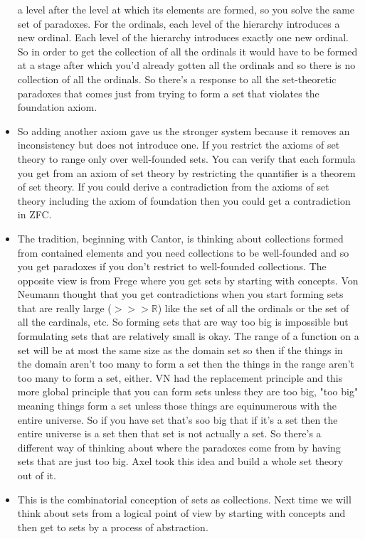 \documentclass[12pt]{article}
\theoremstyle{definition}
\begin{document}
\begin{itemize}
        a level after the level at which its elements are formed, so you solve
        the same set of paradoxes. For the ordinals, each level of the
        hierarchy introduces a new ordinal. Each level of the hierarchy
        introduces exactly one new ordinal. So in order to get the collection
        of all the ordinals it would have to be formed at a stage after which
        you'd already gotten all the ordinals and so there is no collection of
        all the ordinals. So there's a response to all the set-theoretic
        paradoxes that comes just from trying to form a set that violates the
        foundation axiom. 
    \item
        So adding another axiom gave us the stronger system because it removes
        an inconsistency but does not introduce one. If you restrict the axioms
        of set theory to range only over well-founded sets. You can verify that
        each formula you get from an axiom of set theory by restricting the
        quantifier is a theorem of set theory. If you could derive a
        contradiction from the axioms of set theory including the axiom of
        foundation then you could get a contradiction in ZFC.
    \item
        The tradition, beginning with Cantor, is thinking about collections
        formed from contained elements and you need collections to be
        well-founded and so you get paradoxes if you don't restrict to
        well-founded collections. The opposite view is from Frege where you get
        sets by starting with concepts. Von Neumann thought that you get
        contradictions when you start forming sets that are really large ($>>>
        \mathbb{R}$) like the set of all the ordinals or the set of all the
        cardinals, etc. So forming sets that are way too big is impossible but
        formulating sets that are relatively small is okay. The range of a
        function on a set will be at most the same size as the domain set so
        then if the things in the domain aren't too many to form a set then the
        things in the range aren't too many to form a set, either. VN had the
        replacement principle and this more global principle that you can form
        sets unless they are too big, "too big" meaning things form a set
        unless those things are equinumerous with the entire universe. So if
        you have set that's soo big that if it's a set then the entire universe
        is a set then that set is not actually a set. So there's a different
        way of thinking about where the paradoxes come from by having sets that
        are just too big. Axel took this idea and build a whole set theory out
        of it. 
    \item
        This is the combinatorial conception of sets as collections. Next time
        we will think about sets from a logical point of view by starting with
        concepts and then get to sets by a process of abstraction.
\end{itemize}
\end{document}
